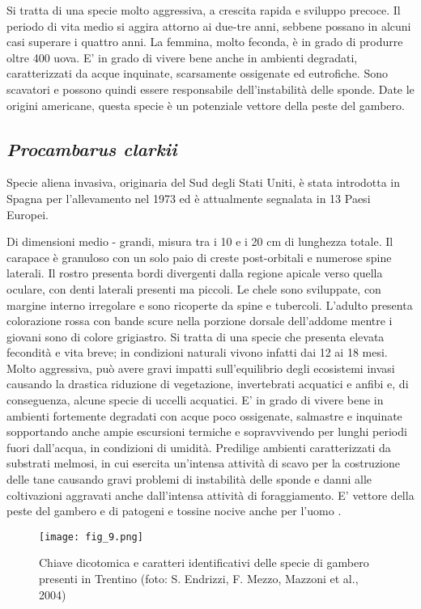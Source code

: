 \documentclass[11pt,a4paper,italian,twoside,openany]{memoir}
\begin{document}
Si tratta di una specie molto aggressiva, a crescita rapida e sviluppo precoce. Il periodo di vita medio si aggira attorno ai due-tre anni, sebbene possano in alcuni casi superare i quattro anni. La femmina, molto feconda, è in grado di produrre oltre 400 uova. E' in grado di vivere bene anche in ambienti degradati, caratterizzati da acque inquinate, scarsamente ossigenate ed eutrofiche. Sono scavatori e possono quindi essere responsabile dell'instabilità delle sponde. Date le origini americane, questa specie è un potenziale vettore della peste del gambero.

\subsection{\emph{Procambarus clarkii}}
Specie aliena invasiva, originaria del Sud degli Stati Uniti, è stata introdotta in Spagna per l'allevamento nel 1973 ed è attualmente segnalata in 13 Paesi Europei.

Di dimensioni medio - grandi, misura tra i 10 e i 20 cm di lunghezza totale. Il carapace è granuloso con un solo paio di creste post-orbitali e numerose spine laterali. Il rostro presenta bordi divergenti dalla regione apicale verso quella oculare, con denti laterali presenti ma piccoli. Le chele sono sviluppate, con margine interno irregolare e sono ricoperte da spine e tubercoli. L'adulto presenta colorazione rossa con bande scure nella porzione dorsale dell'addome mentre i giovani sono di colore grigiastro. Si tratta di una specie che presenta elevata fecondità e vita breve; in condizioni naturali vivono infatti dai 12 ai 18 mesi. Molto aggressiva, può avere gravi impatti sull'equilibrio degli ecosistemi invasi causando la drastica riduzione di vegetazione, invertebrati acquatici e anfibi e, di conseguenza, alcune specie di uccelli acquatici. E' in grado di vivere bene in ambienti fortemente degradati con acque poco ossigenate, salmastre e inquinate sopportando anche ampie escursioni termiche e sopravvivendo per lunghi periodi fuori dall'acqua, in condizioni di umidità. Predilige ambienti caratterizzati da substrati melmosi, in cui esercita un'intensa attività di scavo per la costruzione delle tane causando gravi problemi di instabilità delle sponde e danni alle coltivazioni aggravati anche dall'intensa attività di foraggiamento. E' vettore della peste del gambero e di patogeni e tossine nocive anche per l'uomo \cite{Mazzoni 2004} \cite{Souty-Grosset 2006} \cite{Kouba 2014}.

\begin{figure}
  \centering
  \texttt{[image: fig\_9.png]}
  \caption{Chiave dicotomica e caratteri identificativi delle specie di gambero presenti in Trentino (foto: S. Endrizzi, F. Mezzo, Mazzoni et al., 2004)}
  \label{fig_9}
\end{figure}
\end{document}
